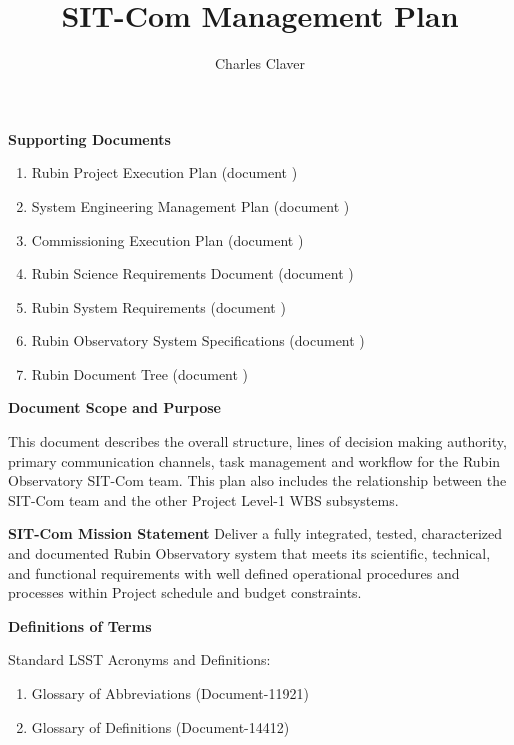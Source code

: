 \documentclass[SE,toc]{lsstdoc}
\title{SIT-Com Management Plan}
\author{%
Charles Claver
}
\date{\vcsDate}
\begin{document}
\maketitle


\textbf{Supporting Documents}

    \begin{enumerate}
        \item Rubin Project Execution Plan (document )

        \item System Engineering Management Plan (document )

        \item Commissioning Execution Plan (document )

        \item Rubin Science Requirements Document (document )

        \item Rubin System Requirements (document )

        \item Rubin Observatory System Specifications (document )

        \item Rubin Document Tree (document )

    \end{enumerate}

\textbf{Document Scope and Purpose}
\label{sec:Scope}

This document describes the overall structure, lines of decision making authority, primary communication channels, task management and workflow for the Rubin Observatory SIT-Com team.
This plan also includes the relationship between the SIT-Com team and the other Project Level-1 WBS subsystems.

\textbf{SIT-Com Mission Statement}
Deliver a fully integrated, tested, characterized and documented Rubin Observatory system that meets its scientific, technical, and functional requirements with well defined operational procedures and processes within Project schedule and budget constraints.

\textbf{Definitions of Terms}

Standard LSST Acronyms and Definitions:
\begin{enumerate}
    \item Glossary of Abbreviations (Document-11921)
    \item Glossary of Definitions (Document-14412)
\end{enumerate}
\end{document}
